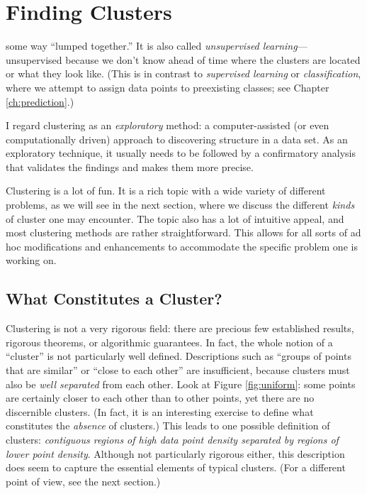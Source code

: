

\chapter{Finding Clusters}{}{}
\label{ch:clustering}

  
 some way ``lumped together.'' It
is also called \emph{unsupervised learning}---unsupervised  because we
don't know ahead of time where the clusters are located or what they
look like. (This is in contrast to \emph{supervised learning} or
\emph{classification}, where we attempt to assign data points to
preexisting classes; see Chapter \ref{ch:prediction}.)

I regard clustering as an \emph{exploratory} method: a
computer-assisted (or even computationally driven) approach to
discovering structure in a data set. As an exploratory technique, it
usually needs to be followed by a confirmatory analysis that validates
the findings and makes them more precise.

Clustering is a lot of fun. It is a rich topic with a wide variety of
different problems, as we will see in the next section, where we
discuss the different \emph{kinds} of cluster one may encounter. The
topic also has a lot of intuitive appeal, and most clustering methods
are rather straightforward. This allows for all sorts of ad hoc
modifications and enhancements to accommodate the specific problem one
is working on.

\section{What Constitutes a Cluster?}


Clustering is not a very rigorous field: there are precious few
established results, rigorous theorems, or algorithmic guarantees. In
fact, the whole notion of a ``cluster'' is not particularly well
defined.  Descriptions such as ``groups of points that are similar''
or ``close to each other'' are insufficient, because clusters must
also be \emph{well separated} from each other. Look at Figure
\ref{fig:uniform}: some points are certainly closer to
each other than to other points, yet there\vadjust{\pagebreak} are no discernible clusters.
(In fact, it is an interesting exercise to define what constitutes the
\emph{absence} of clusters.) This leads to one possible definition of
clusters: \emph{contiguous regions of high data point density
  separated by regions of lower point density}. Although not
particularly rigorous either, this description does seem to capture
the essential elements of typical clusters. (For a different point of
view, see the next section.)


